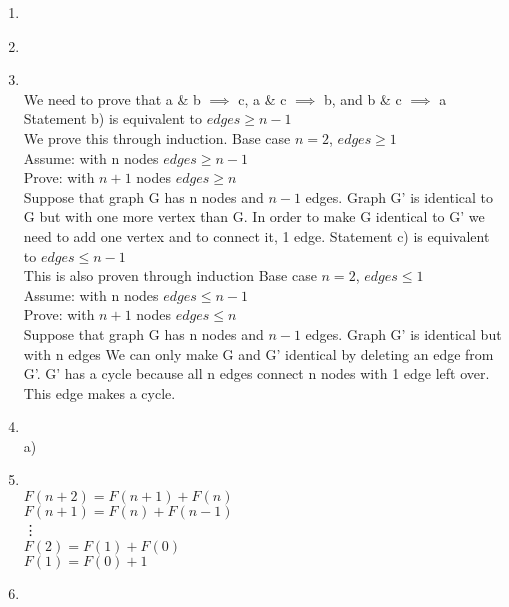 \documentclass[11pt]{article}
\begin{document}
\begin{enumerate}
            \item \\
            \item \\
            \item \\
            We need to prove that a \& b $\implies$ c, a \& c $\implies$ b, and b \& c $\implies$ a\\
            \newline
            Statement b) is equivalent to $edges\geq n-1$\\
            We prove this through induction.  Base case $n=2$, $edges\geq1$\\
            Assume: with n nodes $edges\geq n-1$\\
            Prove: with $n+1$ nodes $edges\geq n$\\
            Suppose that graph G has n nodes and $n-1$ edges.  Graph G' is identical to G but with
            one more vertex than G.  In order to make G identical to G' we need to add one vertex and
            to connect it, 1 edge.
            \newline
            \newline
            Statement c) is equivalent to $edges\leq n-1$\\
            This is also proven through induction
            Base case $n=2$, $edges\leq1$\\
            Assume: with n nodes $edges\leq n-1$\\
            Prove: with $n+1$ nodes $edges\leq n$\\
            Suppose that graph G has n nodes and $n-1$ edges.  Graph G' is identical but with n edges
            We can only make G and G' identical by deleting an edge from G'.  G' has a cycle because all
            n edges connect n nodes with 1 edge left over.  This edge makes a cycle.
            \item \\ a) \\
            \item \\
            $F(n+2) = F(n+1) + F(n)$\\
            $F(n+1) = F(n) + F(n-1)$\\
            \vdots\\
            $F(2) = F(1) + F(0)$\\
            $F(1) = F(0) + 1$\\
            \item \\

\end{enumerate}
\end{document}
